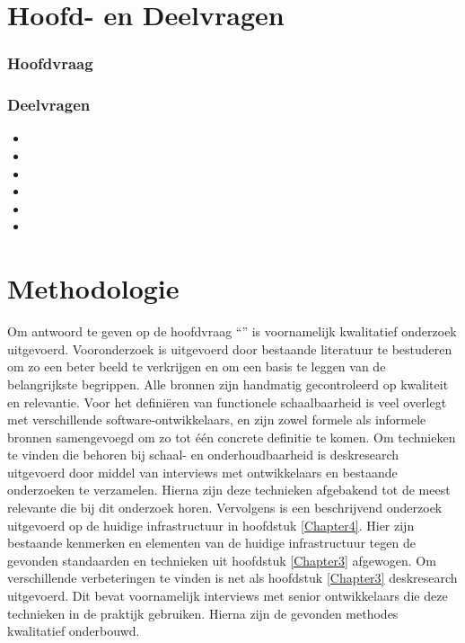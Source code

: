 \section{Hoofd- en Deelvragen}
\subsubsection{Hoofdvraag}
\hoofdvraagname

\subsubsection{Deelvragen}
\begin{itemize}
	\item \deelverwachtingen
	\item \deeltechnieken
	\item \deelhuidig
	\item \deelverbetering
	\item \deelimplementatie
	\item \deelrequirements
\end{itemize}

\section{Methodologie}
Om antwoord te geven op de hoofdvraag \enquote{\hoofdvraagname} is voornamelijk kwalitatief onderzoek uitgevoerd. Vooronderzoek is uitgevoerd door bestaande literatuur te bestuderen om zo een beter beeld te verkrijgen en om een basis te leggen van de belangrijkste begrippen. Alle bronnen zijn handmatig gecontroleerd op kwaliteit en relevantie. Voor het definiëren van functionele schaalbaarheid is veel overlegt met verschillende software-ontwikkelaars, en zijn zowel formele als informele bronnen samengevoegd om zo tot één concrete definitie te komen. Om technieken te vinden die behoren bij schaal- en onderhoudbaarheid is deskresearch uitgevoerd door middel van interviews met ontwikkelaars en bestaande onderzoeken te verzamelen. Hierna zijn deze technieken afgebakend tot de meest relevante die bij dit onderzoek horen. Vervolgens is een beschrijvend onderzoek uitgevoerd op de huidige infrastructuur in hoofdstuk \ref{Chapter4}. Hier zijn bestaande kenmerken en elementen van de huidige infrastructuur tegen de gevonden standaarden en technieken uit hoofdstuk \ref{Chapter3} afgewogen. Om verschillende verbeteringen te vinden is net als hoofdstuk \ref{Chapter3} deskresearch uitgevoerd. Dit bevat voornamelijk interviews met senior ontwikkelaars die deze technieken in de praktijk gebruiken. Hierna zijn de gevonden methodes kwalitatief onderbouwd.

